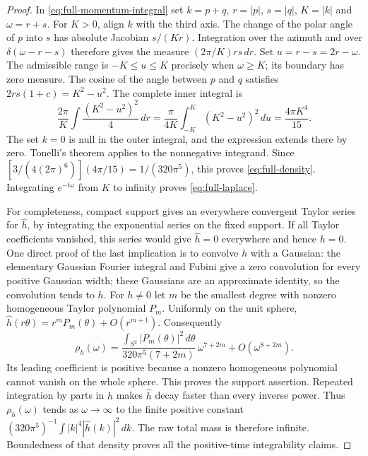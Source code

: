 \begin{proof}
In \eqref{eq:full-momentum-integral} set $k=p+q$, $r=|p|$,
$s=|q|$, $K=|k|$ and $\omega=r+s$. For $K>0$, align $k$ with
the third axis. The change of the polar angle of $p$ into $s$
has absolute Jacobian $s/(Kr)$. Integration over the azimuth and
over $\delta(\omega-r-s)$ therefore gives the measure
$(2\pi/K)rs\,dr$. Set $u=r-s=2r-\omega$. The admissible range
is $-K\le u\le K$ precisely when $\omega\ge K$; its boundary
has zero measure. The cosine of the angle between $p$ and $q$
satisfies $2rs(1+c)=K^2-u^2$. The complete inner integral is
\[
 \frac{2\pi}{K}\int \frac{ (K^2-u^2)^2}{4}\,dr
 = \frac{\pi}{4K}\int_{-K}^K(K^2-u^2)^2\,du
 = \frac{4\pi K^4}{15}.
\]
The set $k=0$ is null in the outer integral, and the expression
extends there by zero. Tonelli's theorem applies to the
nonnegative integrand. Since
$[3/(4(2\pi)^6)](4\pi/15)=1/(320\pi^5)$, this proves
\eqref{eq:full-density}. Integrating $e^{-t\omega}$ from $K$
to infinity proves \eqref{eq:full-laplace}.

For completeness, compact support gives an everywhere convergent
Taylor series for $\widehat h$, by integrating the exponential
series on the fixed support. If all Taylor coefficients vanished,
this series would give $\widehat h=0$ everywhere and hence $h=0$.
One direct proof of the last implication is to convolve $h$ with
a Gaussian: the elementary Gaussian Fourier integral and Fubini
give a zero convolution for every positive Gaussian width; these
Gaussians are an approximate identity, so the convolution tends
to $h$. For $h\ne0$ let $m$ be the smallest degree with nonzero
homogeneous Taylor polynomial $P_m$. Uniformly on the unit sphere,
$\widehat h(r\theta)=r^mP_m(\theta)+O(r^{m+1})$.
Consequently
\begin{equation}\label{eq:full-small-energy}
 \rho_h(\omega)=
 \frac{\int_{S^2}|P_m(\theta)|^2\,d\theta}
       {320\pi^5(7+2m)}\,\omega^{7+2m}
       +O(\omega^{8+2m}).
\end{equation}
Its leading coefficient is positive because a nonzero homogeneous
polynomial cannot vanish on the whole sphere. This proves the
support assertion. Repeated integration by parts in $h$ makes
$\widehat h$ decay faster than every inverse power. Thus
$\rho_h(\omega)$ tends as $\omega\to\infty$ to the finite
positive constant
$(320\pi^5)^{-1}\int |k|^4|\widehat h(k)|^2\,dk$.
The raw total mass is therefore infinite. Boundedness of that
density proves all the positive-time integrability claims.
\end{proof}

